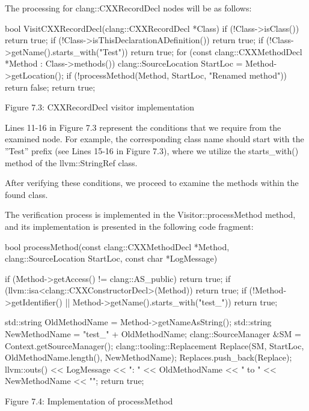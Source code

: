 The processing for clang::CXXRecordDecl nodes will be as follows:

\begin{cpp}
bool VisitCXXRecordDecl(clang::CXXRecordDecl *Class) {
  if (!Class->isClass())
    return true;
  if (!Class->isThisDeclarationADefinition())
    return true;
  if (!Class->getName().starts_with("Test"))
    return true;
  for (const clang::CXXMethodDecl *Method : Class->methods()) {
    clang::SourceLocation StartLoc = Method->getLocation();
    if (!processMethod(Method, StartLoc, "Renamed method"))
      return false;
  }
  return true;
}
\end{cpp}

\begin{center}
Figure 7.3: CXXRecordDecl visitor implementation
\end{center}

Lines 11-16 in Figure 7.3 represent the conditions that we require from the examined node. For example, the corresponding class name should start with the ”Test” prefix (see Lines 15-16 in Figure 7.3), where we utilize the starts\_with() method of the llvm::StringRef class.

After verifying these conditions, we proceed to examine the methods within the found class.

The verification process is implemented in the Visitor::processMethod method, and its implementation is presented in the following code fragment:

\begin{cpp}
bool processMethod(const clang::CXXMethodDecl *Method,
                   clang::SourceLocation StartLoc, const char *LogMessage) {
  if (Method->getAccess() != clang::AS_public)
    return true;
  if (llvm::isa<clang::CXXConstructorDecl>(Method))
    return true;
  if (!Method->getIdentifier() || Method->getName().starts_with("test_"))
    return true;

  std::string OldMethodName = Method->getNameAsString();
  std::string NewMethodName = "test_" + OldMethodName;
  clang::SourceManager &SM = Context.getSourceManager();
  clang::tooling::Replacement Replace(SM, StartLoc, OldMethodName.length(),
                                      NewMethodName);
  Replaces.push_back(Replace);
  llvm::outs() << LogMessage << ": " << OldMethodName << " to "
               << NewMethodName << "\n";
  return true;
}
\end{cpp}

\begin{center}
Figure 7.4: Implementation of processMethod
\end{center}

